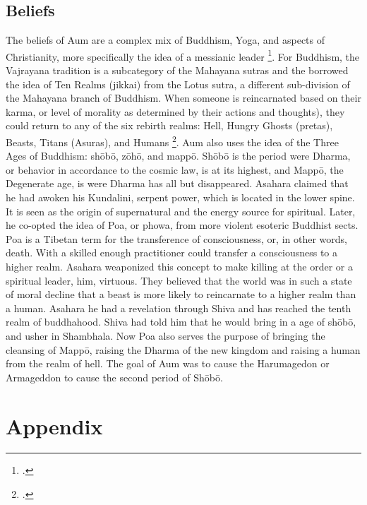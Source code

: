 \documentclass[12pt, letterpaper]{article}
\begin{document}
\subsection{Beliefs}
The beliefs of Aum are a complex mix of Buddhism, Yoga, and aspects of Christianity, more specifically the
idea of a messianic leader \footcite[1144]{metraux_religious_1995}. For Buddhism, the Vajrayana tradition is 
a
subcategory of the Mahayana sutras and the borrowed the idea of Ten Realms (jikkai) from the Lotus sutra, a
different sub-division of the Mahayana branch of Buddhism. When someone is reincarnated based on their karma,
or level of morality as determined by their actions and thoughts), they could return to any of the six rebirth realms: 
Hell, Hungry Ghosts (pretas), Beasts, Titans (Asuras), and Humans \footcite[83]{watanabe_religion_1998}. Aum also uses the idea of the Three Ages 
of Buddhism: sh\=ob\=o, z\=oh\=o, and mapp\=o. Sh\=ob\=o is the period were Dharma, or behavior in accordance
to the cosmic law, is at its highest, and Mapp\=o, the Degenerate age, is were Dharma has all but 
disappeared. Asahara claimed that he had awoken his Kundalini, serpent power, which is located in the lower
spine. It is seen as the origin of supernatural and the energy source for spiritual. Later, he co-opted the
idea of Poa, or phowa, from more violent esoteric Buddhist sects. Poa is a Tibetan term for the transference
of consciousness, or, in other words, death. With a skilled enough practitioner could transfer a 
consciousness to a higher realm. Asahara weaponized this concept to make killing at the order or a spiritual
leader, him, virtuous. They believed that the world was in such a state of moral decline that a beast is more
likely to reincarnate to a higher realm than a human. Asahara he had a revelation through Shiva and has
reached the tenth realm of buddhahood. Shiva had told him that he would bring in a age of sh\=ob\=o, and
usher in Shambhala. Now Poa also serves the purpose of bringing the cleansing of Mapp\=o, raising the Dharma
of the new kingdom and raising a human from the realm of hell. The goal of Aum was to cause the Harumagedon 
or Armageddon to cause the second period of Sh\=ob\=o.

\newpage
\printbibliography{}

\newpage
\section*{Appendix}
\end{document}
